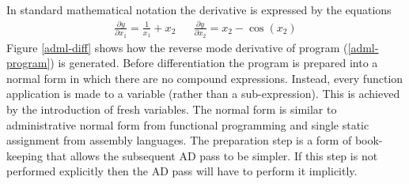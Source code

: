 \documentclass[12pt]{article}
\begin{document}
In standard mathematical notation the derivative is expressed by the
equations
\begin{align*}
\frac{\partial y}{\partial x_1} = \frac{1}{x_1} + x_2
&&
\frac{\partial y}{\partial x_2} = x_2 - \cos(x_2)
\end{align*}
Figure \ref{adml-diff} shows how the reverse mode derivative of
program (\ref{adml-program}) is generated.  Before differentiation the
program is prepared into a normal form in which there are no compound
expressions. Instead, every function application is made to a variable
(rather than a sub-expression).  This is achieved by the introduction
of fresh variables.  The normal form is similar to administrative
normal form from functional programming and single static assignment
from assembly languages.  The preparation step is a form of
book-keeping that allows the subsequent AD pass to be simpler.  If
this step is not performed explicitly then the AD pass will have to
perform it implicitly.

  \newcommand{\diff}[2]{
    \bar{v}_{#1} \frac{\partial v_{#1}}{\partial v_{#2}}
  }
\end{document}
